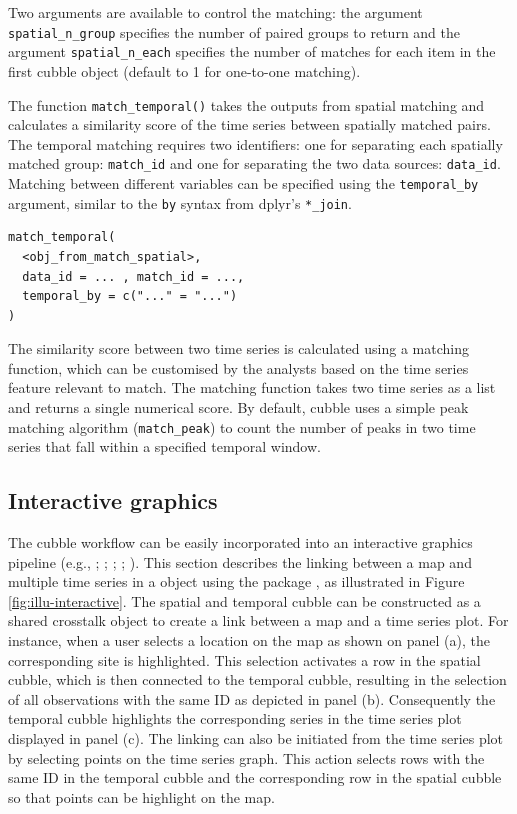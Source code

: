 \documentclass[
  shortnames]{jss}
\begin{document}
Two arguments are available to control the matching: the argument \texttt{spatial\_n\_group} specifies the number of paired groups to return and the argument \texttt{spatial\_n\_each} specifies the number of matches for each item in the first cubble object (default to 1 for one-to-one matching).

The function \texttt{match\_temporal()} takes the outputs from spatial matching and calculates a similarity score of the time series between spatially matched pairs. The temporal matching requires two identifiers: one for separating each spatially matched group: \texttt{match\_id} and one for separating the two data sources: \texttt{data\_id}. Matching between different variables can be specified using the \texttt{temporal\_by} argument, similar to the \texttt{by} syntax from dplyr's \texttt{*\_join}.

\begin{verbatim}
match_temporal(
  <obj_from_match_spatial>, 
  data_id = ... , match_id = ..., 
  temporal_by = c("..." = "...")
)
\end{verbatim}

The similarity score between two time series is calculated using a matching function, which can be customised by the analysts based on the time series feature relevant to match. The matching function takes two time series as a list and returns a single numerical score. By default, cubble uses a simple peak matching algorithm (\texttt{match\_peak}) to count the number of peaks in two time series that fall within a specified temporal window.

\hypertarget{interactive-graphics}{%
\subsection{Interactive graphics}\label{interactive-graphics}}

The cubble workflow can be easily incorporated into an interactive graphics pipeline (e.g., \citet{buja1988elements}; \citet{buja1996interactive}; \citet{sutherland2000orca}; \citet{xie2014reactive}; \citet{cheng2016enabling}). This section describes the linking between a map and multiple time series in a  object using the package  \citep{crosstalk}, as illustrated in Figure \ref{fig:illu-interactive}. The spatial and temporal cubble can be constructed as a shared crosstalk object to create a link between a map and a time series plot. For instance, when a user selects a location on the map as shown on panel (a), the corresponding site is highlighted. This selection activates a row in the spatial cubble, which is then connected to the temporal cubble, resulting in the selection of all observations with the same ID as depicted in panel (b). Consequently the temporal cubble highlights the corresponding series in the time series plot displayed in panel (c). The linking can also be initiated from the time series plot by selecting points on the time series graph. This action selects rows with the same ID in the temporal cubble and the corresponding row in the spatial cubble so that points can be highlight on the map.
\end{document}
